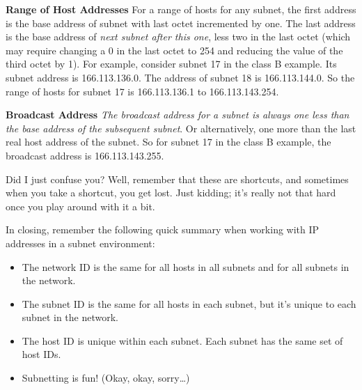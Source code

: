 {\textbf{Range of Host Addresses}} For a range of hosts for any subnet,
the first address is the base address of subnet with last octet
incremented by one. The last address is the base address of {\emph{next
subnet after this one}}, less two in the last octet (which may require
changing a 0 in the last octet to 254 and reducing the value of the
third octet by 1). For example, consider subnet 17 in the class B
example. Its subnet address is 166.113.136.0. The address of subnet 18
is 166.113.144.0. So the range of hosts for subnet 17 is 166.113.136.1
to 166.113.143.254.

{\textbf{Broadcast Address}} {\emph{The broadcast address for a subnet
is always one less than the base address of the subsequent subnet}}. Or
alternatively, one more than the last real host address of the subnet.
So for subnet 17 in the class B example, the broadcast address is
166.113.143.255.

Did I just confuse you? Well, remember that these are shortcuts, and
sometimes when you take a shortcut, you get lost. Just kidding; it's
really not that hard once you play around with it a bit.

In closing, remember the following quick summary when working with IP addresses in a subnet environment:

\begin{itemize}
   \item
      The network ID is the same for all hosts in all subnets and for all subnets in the network.
   \item
      The subnet ID is the same for all hosts in each subnet, but it's unique to each subnet in the network.
   \item
      The host ID is unique within each subnet.
      Each subnet has the same set of host IDs.
   \item
      Subnetting is fun! (Okay, okay, sorry\ldots)
\end{itemize}
